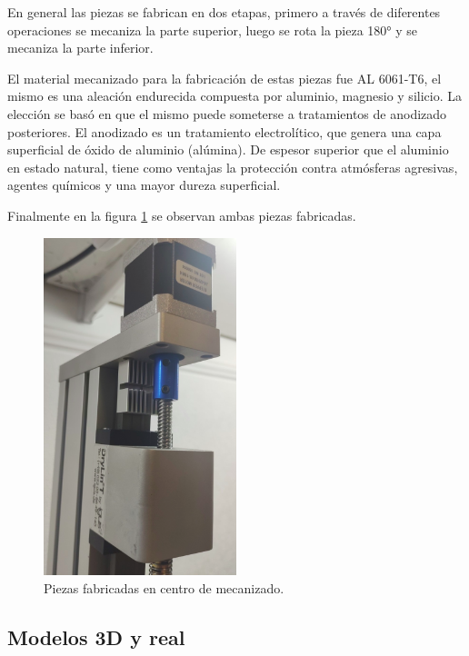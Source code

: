 En general las piezas se fabrican en dos etapas, primero a través de diferentes operaciones se mecaniza la parte superior, luego se rota la pieza 180° y se mecaniza la parte inferior.


El material mecanizado para la fabricación de estas piezas fue AL 6061-T6, el mismo es una aleación endurecida compuesta por aluminio, magnesio y silicio. La elección se basó en que el mismo puede someterse a tratamientos de anodizado posteriores. El anodizado es un tratamiento electrolítico, que genera una capa superficial de óxido de aluminio (alúmina). De espesor superior que el aluminio en estado natural, tiene como ventajas la protección contra atmósferas agresivas, agentes químicos y una mayor dureza superficial.

Finalmente en la figura \ref{fig:real_custom} se observan ambas piezas fabricadas.

\begin{figure}[h]
	\centering
	\includegraphics[width=0.5\textwidth]{./Figures/real_custom.png}
	\caption{Piezas fabricadas en centro de mecanizado.}
	\label{fig:real_custom}
\end{figure}


\subsection{Modelos 3D y real}

